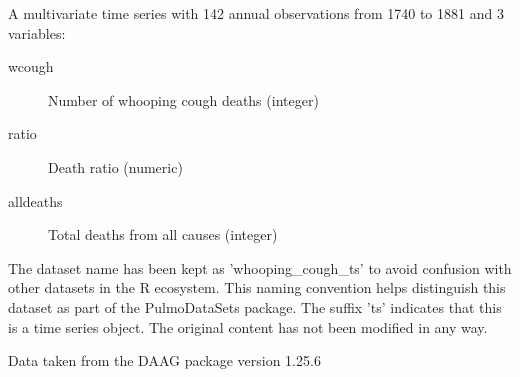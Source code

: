\documentclass[a4paper]{book}
\begin{document}
%
\begin{Format}
A multivariate time series with 142 annual observations from 1740 to 1881
and 3 variables:
\begin{description}

\item[wcough] Number of whooping cough deaths (integer)
\item[ratio] Death ratio (numeric)
\item[alldeaths] Total deaths from all causes (integer)

\end{description}

\end{Format}
%
\begin{Details}
The dataset name has been kept as 'whooping\_cough\_ts' to avoid confusion with other
datasets in the R ecosystem. This naming convention helps distinguish this dataset
as part of the PulmoDataSets package. The suffix 'ts' indicates that this is a
time series object. The original content has not been modified in any way.
\end{Details}
%
\begin{Source}
Data taken from the DAAG package version 1.25.6
\end{Source}
\printindex{}
\end{document}

